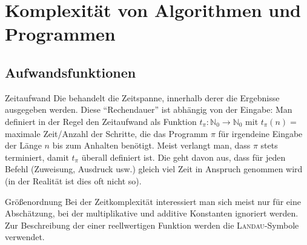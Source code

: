 \chapter{%
    Komplexität von Algorithmen und Programmen%
}

\section{%
    Aufwandsfunktionen%
}

\begin{Def}{Zeitaufwand}
    Die  behandelt die Zeitspanne, innerhalb derer
    die Ergebnisse ausgegeben werden.
    Diese "`Rechendauer"' ist abhängig von der Eingabe:
    Man definiert in der Regel den Zeitaufwand als Funktion
    $t_\pi: \mathbb{N}_0 \rightarrow \mathbb{N}_0$ mit $t_\pi(n) =$ maximale
    Zeit/Anzahl der Schritte, die das Programm $\pi$ für irgendeine Eingabe der
    Länge $n$ bis zum Anhalten benötigt.
    Meist verlangt man, dass $\pi$ stets terminiert, damit $t_\pi$ überall
    definiert ist.
    Die  geht davon aus, dass für jeden
    Befehl (Zuweisung, Ausdruck usw.) gleich viel Zeit in Anspruch genommen
    wird (in der Realität ist dies oft nicht so).
\end{Def}

\begin{Def}{Größenordnung}
    Bei der Zeitkomplexität interessiert man sich meist nur für eine
    Abschätzung, bei der multiplikative und additive Konstanten ignoriert
    werden.
    Zur Beschreibung der  einer
    reellwertigen Funktion werden die \textsc{Landau}-Symbole verwendet.
\end{Def}


